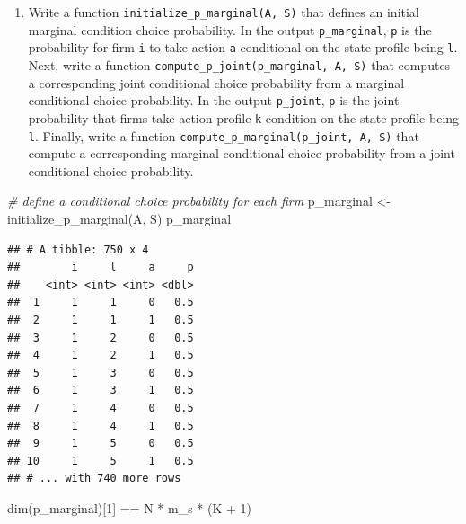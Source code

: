\documentclass[
]{book}
\newenvironment{Shaded}{\begin{snugshade}}{\end{snugshade}}
\newcommand{\CommentTok}[1]{\textcolor[rgb]{0.56,0.35,0.01}{\textit{#1}}}
\newcommand{\DecValTok}[1]{\textcolor[rgb]{0.00,0.00,0.81}{#1}}
\newcommand{\FunctionTok}[1]{\textcolor[rgb]{0.00,0.00,0.00}{#1}}
\newcommand{\NormalTok}[1]{#1}
\newcommand{\OtherTok}[1]{\textcolor[rgb]{0.56,0.35,0.01}{#1}}
\newcommand{\SpecialCharTok}[1]{\textcolor[rgb]{0.00,0.00,0.00}{#1}}
\providecommand{\tightlist}{%
  \setlength{\itemsep}{0pt}\setlength{\parskip}{0pt}}
\begin{document}
\begin{enumerate}
\def\labelenumi{\arabic{enumi}.}
\setcounter{enumi}{4}
\tightlist
\item
  Write a function \texttt{initialize\_p\_marginal(A,\ S)} that defines an initial marginal condition choice probability. In the output \texttt{p\_marginal}, \texttt{p} is the probability for firm \texttt{i} to take action \texttt{a} conditional on the state profile being \texttt{l}. Next, write a function \texttt{compute\_p\_joint(p\_marginal,\ A,\ S)} that computes a corresponding joint conditional choice probability from a marginal conditional choice probability. In the output \texttt{p\_joint}, \texttt{p} is the joint probability that firms take action profile \texttt{k} condition on the state profile being \texttt{l}. Finally, write a function \texttt{compute\_p\_marginal(p\_joint,\ A,\ S)} that compute a corresponding marginal conditional choice probability from a joint conditional choice probability.
\end{enumerate}

\begin{Shaded}
\begin{Highlighting}[]
\CommentTok{\# define a conditional choice probability for each firm}
\NormalTok{p\_marginal }\OtherTok{\textless{}{-}} \FunctionTok{initialize\_p\_marginal}\NormalTok{(A, S)}
\NormalTok{p\_marginal}
\end{Highlighting}
\end{Shaded}

\begin{verbatim}
## # A tibble: 750 x 4
##        i     l     a     p
##    <int> <int> <int> <dbl>
##  1     1     1     0   0.5
##  2     1     1     1   0.5
##  3     1     2     0   0.5
##  4     1     2     1   0.5
##  5     1     3     0   0.5
##  6     1     3     1   0.5
##  7     1     4     0   0.5
##  8     1     4     1   0.5
##  9     1     5     0   0.5
## 10     1     5     1   0.5
## # ... with 740 more rows
\end{verbatim}

\begin{Shaded}
\begin{Highlighting}[]
\FunctionTok{dim}\NormalTok{(p\_marginal)[}\DecValTok{1}\NormalTok{] }\SpecialCharTok{==}\NormalTok{ N }\SpecialCharTok{*}\NormalTok{ m\_s }\SpecialCharTok{*}\NormalTok{ (K }\SpecialCharTok{+} \DecValTok{1}\NormalTok{)}
\end{Highlighting}
\end{Shaded}
\end{document}

